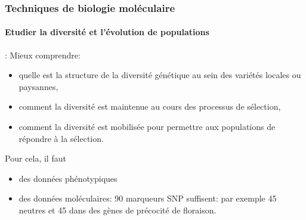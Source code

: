 \begin{frame}
\frametitle{Techniques de biologie moléculaire}
\framesubtitle{Etudier la diversité et l'évolution de populations}

: Mieux comprendre:

\begin{itemize}
\item quelle est la structure de la diversité génétique au sein des variétés locales ou paysannes,
\item comment la diversité est maintenue au cours des processus de sélection,
\item comment la diversité est mobilisée pour permettre aux populations de répondre à la sélection.
\end{itemize}

Pour cela, il faut
\begin{itemize}
\item des données phénotypiques
\item des données moléculaires: 90 marqueurs SNP suffisent: par exemple 45 neutres et 45 dans des gènes de précocité de floraison.
\end{itemize}



\end{frame}



